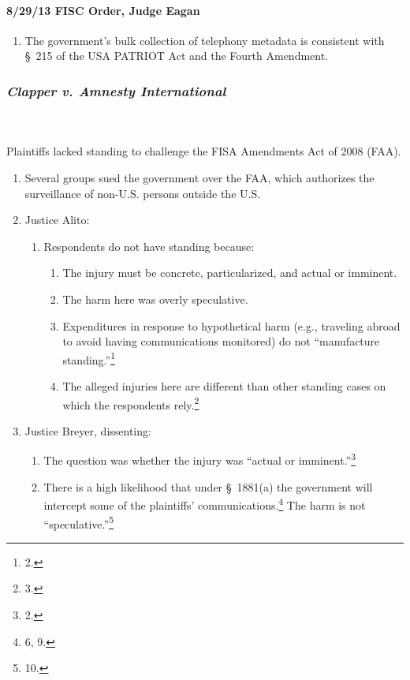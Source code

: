 \paragraph{8/29/13 FISC Order, Judge Eagan}

\begin{enumerate}
    \item The government's bulk collection of telephony metadata is consistent 
    with \S\ 215 of the USA PATRIOT Act and the Fourth Amendment.
\end{enumerate}

\subsubsection{\emph{Clapper v. Amnesty International}}
~\\\\
Plaintiffs lacked standing to challenge the FISA Amendments Act of 2008 (FAA).

\begin{enumerate}
    \item Several groups sued the government over the FAA, which authorizes 
    the surveillance of non-U.S. persons outside the U.S.
    \item Justice Alito:
    \begin{enumerate}
        \item Respondents do not have standing because:
        \begin{enumerate}
            \item The injury must be concrete, particularized, and actual or 
            imminent.
            \item The harm here was overly speculative.
            \item Expenditures in response to hypothetical harm (e.g., 
            traveling abroad to avoid having communications monitored) do not 
            ``manufacture standing.''\footnote{2.}
            \item The alleged injuries here are different than other standing 
            cases on which the respondents rely.\footnote{3.}
        \end{enumerate}
    \end{enumerate}
    \item Justice Breyer, dissenting:
    \begin{enumerate}
        \item The question was whether the injury was ``actual or 
        imminent.''\footnote{2.}
        \item There is a high likelihood that under \S\ 1881(a) the government 
        will intercept some of the plaintiffs' communications.\footnote{6, 9.} 
        The harm is not ``speculative.''\footnote{10.}
    \end{enumerate}
\end{enumerate}
